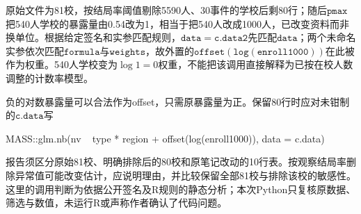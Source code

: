 原始文件为81校，按结局率阈值剔除5590人、30事件的学校后剩80行；随后$\mathtt{pmax}$把540人学校的暴露量由0.54改为1，相当于把540人改成1000人，已改变资料而非换单位。根据给定签名和实参匹配规则，$\mathtt{data=c.data2}$先匹配$\mathtt{data}$；两个未命名实参依次匹配$\mathtt{formula}$与$\mathtt{weights}$，故外置的$\mathtt{offset(log(enroll1000))}$在此被作为权重。540人学校变为$\log1=0$权重，不能把该调用直接解释为已按在校人数调整的计数率模型。\par 负的对数暴露量可以合法作为offset，只需原暴露量为正。保留80行时应对未钳制的$\mathtt{c.data}$写
\begin{rcode}
MASS::glm.nb(nv ~ type * region +
  offset(log(enroll1000)), data = c.data)
\end{rcode}
报告须区分原始81校、明确排除后的80校和原笔记改动的10行表。按观察结局率删除异常值可能改变估计，应说明理由，并比较保留全部81校与排除该校的敏感性。这里的调用判断为依据公开签名及R规则的静态分析；本次Python只复核原数据、筛选与数值，未运行R或声称作者确认了代码问题。
\par\nobreak\smallskip{}

